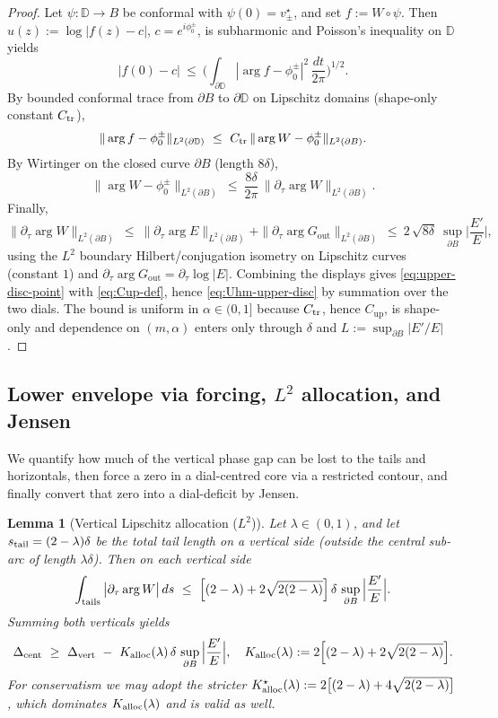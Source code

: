 \documentclass[11pt]{article}
\numberwithin{equation}{section}
\newtheorem{lemma}[theorem]{Lemma}
\theoremstyle{remark}
\newcommand{\D}{\mathbb{D}}
\newcommand{\Gout}{G_{\mathrm{out}}}
\begin{document}
\begin{proof}
Let $\psi:\D\to B$ be conformal with $\psi(0)=v_\pm^\star$, and set $f:=W\circ\psi$. Then $u(z):=\log|f(z)-c|$, $c=e^{i\phi_0^\pm}$, is subharmonic and Poisson’s inequality on $\D$ yields
\[
|f(0)-c|\ \le\ \Big(\int_{\partial\D}|\arg f-\phi_0^\pm|^2\,\frac{dt}{2\pi}\Big)^{1/2}.
\]
By bounded conformal trace from $\partial B$ to $\partial\D$ on Lipschitz domains (shape-only constant $C_{\rm tr}$),
\[
\|\arg f-\phi_0^\pm\|_{L^2(\partial\D)}\ \le\ C_{\rm tr}\,\|\arg W-\phi_0^\pm\|_{L^2(\partial B)}.
\]
By Wirtinger on the closed curve $\partial B$ (length $8\delta$),
\[
\|\arg W-\phi_0^\pm\|_{L^2(\partial B)}\ \le\ \frac{8\delta}{2\pi}\,\|\partial_\tau\arg W\|_{L^2(\partial B)}.
\]
Finally,
\[
\|\partial_\tau\arg W\|_{L^2(\partial B)}\ \le\ \|\partial_\tau\arg E\|_{L^2(\partial B)}+\|\partial_\tau\arg \Gout\|_{L^2(\partial B)}
\ \le\ 2\,\sqrt{8\delta}\ \sup_{\partial B}\Big|\frac{E'}{E}\Big|,
\]
using the $L^2$ boundary Hilbert/conjugation isometry on Lipschitz curves (constant $1$) and $\partial_\tau\arg \Gout=\partial_\tau\log|E|$. Combining the displays gives \eqref{eq:upper-disc-point} with \eqref{eq:Cup-def}, hence \eqref{eq:Uhm-upper-disc} by summation over the two dials. The bound is uniform in $\alpha\in(0,1]$ because $C_{\rm tr}$, hence $C_{\mathrm{up}}$, is shape-only and dependence on $(m,\alpha)$ enters only through $\delta$ and $L:=\sup_{\partial B}|E'/E|$.
\end{proof}

\subsection{Lower envelope via forcing, $L^2$ allocation, and Jensen}\label{subsec:lower-new}

We quantify how much of the vertical phase gap can be lost to the tails and horizontals, then force a zero in a dial-centred core via a restricted contour, and finally convert that zero into a dial-deficit by Jensen.

\begin{lemma}[Vertical Lipschitz allocation ($L^2$)]\label{lem:allocL2}
Let $\lambda\in(0,1)$, and let $s_{\rm tail}=(2-\lambda)\delta$ be the total tail length on a vertical side (outside the central sub-arc of length $\lambda\delta$). Then on each vertical side
\[
\int_{\textup{tails}} \big|\partial_\tau \arg W\big|\,ds
\ \le\ \Big[(2-\lambda)+2\sqrt{2(2-\lambda)}\Big]\,\delta\,\sup_{\partial B}\Big|\frac{E'}{E}\Big|.
\]
Summing both verticals yields
\[
\Delta_{\rm cent}\ \ge\ \Delta_{\rm vert}\ -\ K_{\rm alloc}(\lambda)\,\delta\,\sup_{\partial B}\Big|\frac{E'}{E}\Big|,
\quad
K_{\rm alloc}(\lambda):=2\Big[(2-\lambda)+2\sqrt{2(2-\lambda)}\Big].
\]
For conservatism we may adopt the stricter $K_{\rm alloc}^{\star}(\lambda):=2\big[(2-\lambda)+4\sqrt{2(2-\lambda)}\big]$, which dominates $K_{\rm alloc}(\lambda)$ and is valid as well.
\end{lemma}
\end{document}
